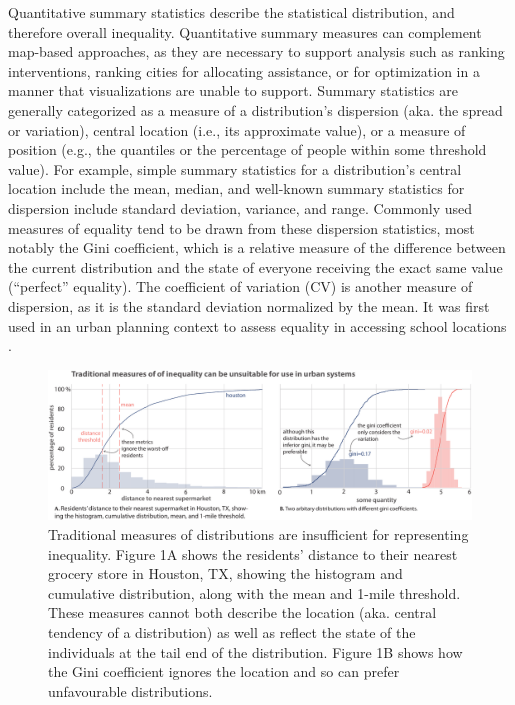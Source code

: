 \documentclass[final,3p,times,onecolumn,sort&compress]{elsarticle}
\begin{document}
Quantitative summary statistics describe the statistical distribution, and therefore overall inequality.
Quantitative summary measures can complement map-based approaches, as they are necessary to support analysis such as ranking interventions, ranking cities for allocating assistance, or for optimization in a manner that visualizations are unable to support.
Summary statistics are generally categorized as a measure of a distribution’s dispersion (aka. the spread or variation), central location (i.e., its approximate value), or a measure of position (e.g., the quantiles or the percentage of people within some threshold value).
For example, simple summary statistics for a distribution’s central location include the mean, median, and well-known summary statistics for dispersion include standard deviation, variance, and range.
Commonly used measures of equality tend to be drawn from these dispersion statistics, most notably the Gini coefficient, which is a relative measure of the difference between the current distribution and the state of everyone receiving the exact same value (“perfect” equality).
The coefficient of variation (CV) is another measure of dispersion, as it is the standard deviation normalized by the mean.
It was first used in an urban planning context to assess equality in accessing school locations \citep{Pacione1989-ui}. 

\begin{figure}
    \includegraphics[width=0.9\linewidth]{report/fig/fig1v2.pdf} 
    \caption{Traditional measures of distributions are insufficient for representing inequality. 
    Figure 1A shows the residents' distance to their nearest grocery store in Houston, TX, showing the histogram and cumulative distribution, along with the mean and 1-mile threshold. 
    These measures cannot both describe the location (aka. central tendency of a distribution) as well as reflect the state of the individuals at the tail end of the distribution.
    Figure 1B shows how the Gini coefficient ignores the location and so can prefer unfavourable distributions.}
    \label{fig:current_metrics}
\end{figure}
\end{document}
